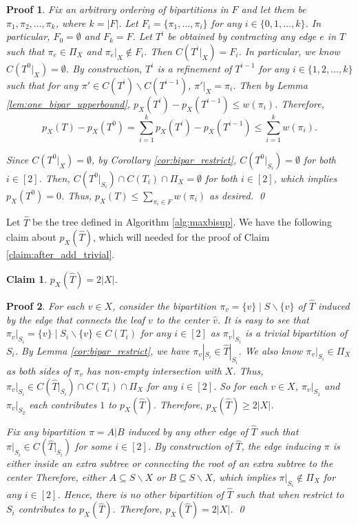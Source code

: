 \documentclass[twocolumn]{bmcart}%
\theoremstyle{mystyle}
\newtheorem{claim}{Claim}
\theoremstyle{proofstyle}
\newtheorem*{proof2}{Proof}
\newenvironment{proofnospace}{\begin{proof2}}{\qed \end{proof2}}
\begin{document}
\lemCompatibleSetUpperbound*
\begin{proofnospace}
    Fix an arbitrary ordering of bipartitions in $F$ and let them be $\pi_1,\pi_2,\dots,\pi_k$, where $k = |F|$. Let $F_i = \{\pi_1,\dots, \pi_i\}$ for any $i \in \{0,1,\dots,k\}$. In particular, $F_0 = \emptyset$ and $F_k = F$. Let $T^i$ be obtained by contracting any edge $e$ in $T$ such that $\pi_e \in \Pi_X$ and $\pi_e|_X \notin F_i$. Then $C(T^i|_X) = F_i$. In particular, we know $C(T^0|_X) = \emptyset$. By construction, $T^i$ is a refinement of $T^{i-1}$ for any $i \in \{1,2,\dots,k\}$ such that for any $\pi' \in C(T^i)\backslash C(T^{i-1})$, $\pi'|_X = \pi_i$. Then by Lemma \ref{lem:one_bipar_upperbound}, $p_X(T^i) - p_X(T^{i-1}) \le w(\pi_i)$. Therefore, 
    \[p_X(T) - p_X(T^0) = \sum_{i = 1}^k p_X(T^i) - p_X(T^{i-1}) \le \sum_{i = 1}^k w(\pi_i).\]
    
    Since $C(T^0|_X) = \emptyset$, by Corollary \ref{cor:bipar_restrict}, $C(T^0|_{S_i}) = \emptyset$ for both $i \in [2]$. Then, $C(T^0|_{S_i}) \cap C(T_i) \cap \Pi_X = \emptyset$ for both $i \in [2]$, which implies $p_X(T^0) = 0$. Thus, $p_X(T) \le \sum_{\pi_i \in F}w(\pi_i)$ as desired.
\end{proofnospace}


Let $\hat{T}$ be the tree defined in Algorithm \ref{alg:maxbisup}. We have the following claim about $p_X(\hat{T})$, which will needed for the proof of Claim \ref{claim:after_add_trivial}.
\begin{claim} \label{claim:begin_tree}
    $p_X(\hat{T}) = 2 |X|$. 
\end{claim}
\begin{proofnospace}
    For each $v \in X$, consider the bipartition $\pi_v = \{v\}\mid S \backslash \{v\}$ of $\hat{T}$ induced by the edge that connects the leaf $v$ to the center $\hat{v}$. It is easy to see that $\pi_v|_{S_i} = \{v\} \mid S_i \backslash \{v\} \in C(T_i)$ for any $i \in [2]$ as $\pi_v|_{S_i}$ is a trivial bipartition of $S_i$. By Lemma \ref{cor:bipar_restrict}, we have $\pi_v|_{S_i} \in \hat{T}|_{S_i}$. We also know $\pi_v|_{S_i} \in \Pi_X$ as both sides of $\pi_v$ has non-empty intersection with $X$. Thus, $\pi_v|_{S_i} \in C(\hat{T}|_{S_i}) \cap C(T_i) \cap \Pi_X$ for any $i \in [2]$. So for each $v \in X$, $\pi_v|_{S_1}$ and $\pi_v|_{S_2}$ each contributes $1$ to $p_X(\hat{T})$. Therefore, $p_X(\hat{T}) \ge 2|X|$. 
    
    Fix any bipartition $\pi = A|B$ induced by any other edge of $\hat{T}$ such that $\pi|_{S_i} \in C(\hat{T}|_{S_i})$ for some $i \in [2]$. By construction of $\hat{T}$, the edge inducing $\pi$ is either inside an extra subtree or connecting the root of an extra subtree to the center Therefore, either $A \subseteq S\backslash X $ or $B \subseteq S \backslash X$, which implies $\pi|_{S_i} \notin \Pi_X$ for any $i \in [2]$. Hence, there is no other bipartition of $\hat{T}$ such that when restrict to $S_i$ contributes to $p_X(\hat{T})$. Therefore, $p_X(\hat{T}) = 2|X|$.
\end{proofnospace}
\end{document}
